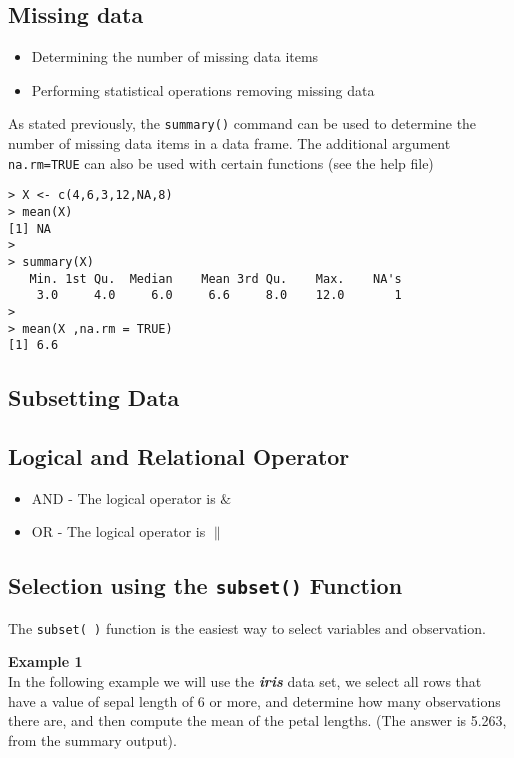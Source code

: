 \documentclass[12pt]{article}
\begin{document}
\subsection*{Missing data}
\begin{itemize}
\item Determining the number of missing data items
\item Performing statistical operations removing missing data
\end{itemize}

As stated previously, the \texttt{summary()} command can be used to determine the number of missing data items in a data frame. The additional argument \texttt{na.rm=TRUE} can also be used with certain functions (see the help file)

\begin{verbatim}
> X <- c(4,6,3,12,NA,8)
> mean(X)
[1] NA
>
> summary(X)
   Min. 1st Qu.  Median    Mean 3rd Qu.    Max.    NA's 
    3.0     4.0     6.0     6.6     8.0    12.0       1
>
> mean(X ,na.rm = TRUE)
[1] 6.6
\end{verbatim}

\newpage
\subsection*{Subsetting Data}
\subsection*{Logical and Relational Operator}

\begin{itemize}
\item AND - The logical operator is $\&$
\item OR - The logical operator is $\|$
\end{itemize}

\subsection*{Selection using the \texttt{subset()} Function}
The \texttt{subset( )} function is the easiest way to select variables and observation. 


\noindent \textbf{Example 1} \\
In the following example we will use the \textit{\textbf{iris}} data set, we select all rows that have a value of sepal length of 6 or more, and determine how many observations there are, and then compute the mean of the petal lengths. (The answer is 5.263, from the summary output).
\end{document}

